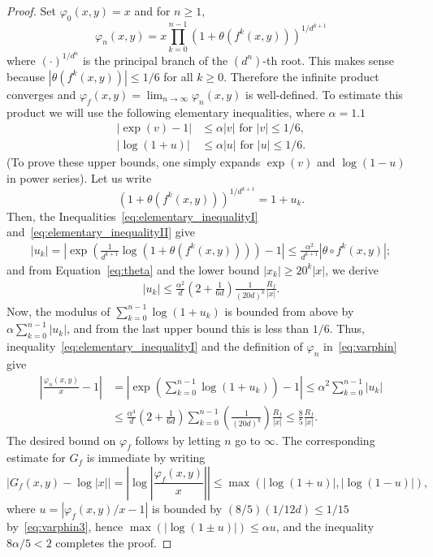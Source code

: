 \documentclass[oneside, 12pt]{amsart}
\newcommand{\abs}[1]{\left\vert#1\right\vert}
\newcommand{\unsur}[1]{\frac{1}{#1}}
\newcommand{\lrpar}[1]{\left(#1\right)}
\theoremstyle{plain}
\theoremstyle{definition}
\numberwithin{equation}{section}       %
\numberwithin{equation}{section}       %
\begin{document}
\begin{proof}
Set $\varphi_0(x,y) = x$ and for $n\geq 1$,
 \begin{equation}\label{eq:varphin}
 \varphi_n(x,y) = x \prod_{k=0}^{n-1} \lrpar{1+ \theta( f^k (x,y))}^{1/d^{k+1}} 
 \end{equation}
where $(\cdot)^{1/d^n}$ is the principal branch of the $(d^n)$-th root. 
 This makes sense because 
$\abs{\theta( f^k (x,y))}\leq 1/6$ for all $k\geq 0$.   
Therefore the infinite product converges and $\varphi_f (x,y) = \lim_{n\to \infty} \varphi_n(x,y) $ is well-defined. 
To estimate this product we will use the following elementary inequalities, where $\alpha = 1.1$
\begin{align}
\label{eq:elementary_inequalityI}
\abs{\exp(v) - 1} & \leq \alpha \abs{v} \text{ for } \abs{v}\leq 1/6, \\ %
\label{eq:elementary_inequalityII}\abs{\log(1+u)} & \leq \alpha \abs{u} \text{ for } \abs{u}\leq 1/6. %
\end{align}
(To prove these upper bounds, one simply expands $\exp(v)$ and $\log(1-u)$ in power series). Let us write
\[
\lrpar{1+ \theta( f^k (x,y))}^{1/d^{k+1}} = 1+u_k.
\]
Then, the Inequalities~\eqref{eq:elementary_inequalityI} and~\eqref{eq:elementary_inequalityII} give
\begin{align}
\abs{u_k} = \abs{\exp\lrpar{\unsur{d^{k+1}}\log\lrpar{1+ \theta( f^k (x,y))}} - 1}  \leq 
\frac{\alpha^2}{d^{k+1}}  \abs{\theta\circ f^k(x,y)};
\end{align}
and from Equation~\eqref{eq:theta} and the lower bound $\abs{x_k}\geq 20^k\abs{x}$, we derive
\begin{align}
\abs{u_k}  \leq \frac{\alpha^2}{d} \lrpar{2 +\frac{1}{6d}} \frac{1}{(20d)^k}\frac{R_f}{\abs{x} }.
\end{align} 
Now, the modulus of $\sum_{k=0}^{n-1} \log(1+u_k)$ is bounded from above by $\alpha \sum_{k=0}^{n-1} \abs{u_k}$, and from the last upper bound this is less than $1/6$.
Thus,   inequality~\eqref{eq:elementary_inequalityI}  and the definition of $\varphi_n$ in~\eqref{eq:varphin} give
\begin{align}
\label{eq:varphin2}
\abs{\frac{\varphi_n(x,y)}{ x}-1} &=
\abs{\exp\lrpar{\sum_{k=0}^{n-1} \log(1+u_k)} - 1} \leq \alpha^2 \sum_{k=0}^{n-1} \abs{u_k}\\ 
&\label{eq:varphin3}
\leq \frac{\alpha^4}{d}\lrpar{2 +\frac{1}{6d}} \sum_{k=0}^{n-1} \lrpar{ \frac{1}{(20d)^k}  } \frac{R_f}{\abs{x}} \leq \frac{8}{5} \frac{R_f}{\abs{x}}. \end{align}
The desired bound on $\varphi_f$ follows by letting $n$ go to $\infty$. 
 The corresponding estimate for $G_f$ is immediate by writing 
 \begin{equation}\label{eq:varphin4}
 \abs{G_f(x,y)  - \log\abs{x}} = \abs{\log \abs{\frac{\varphi_f(x,y)}{x}}}\leq  { \max (\abs{\log(1+u)} ,  \abs{\log(1-u)})}  ,
 \end{equation}
 where $u =  \abs{ {\varphi_f(x,y)}/{x} - 1}$   is bounded by $(8/5)(1/12d) \leq 1/15$
 by~\eqref{eq:varphin3}, hence  
 $\max (\abs{\log(1\pm u)}) \leq \alpha {u}$, and the inequality $8\alpha/5 <2$ completes the proof. 
\end{proof}
\end{document}
